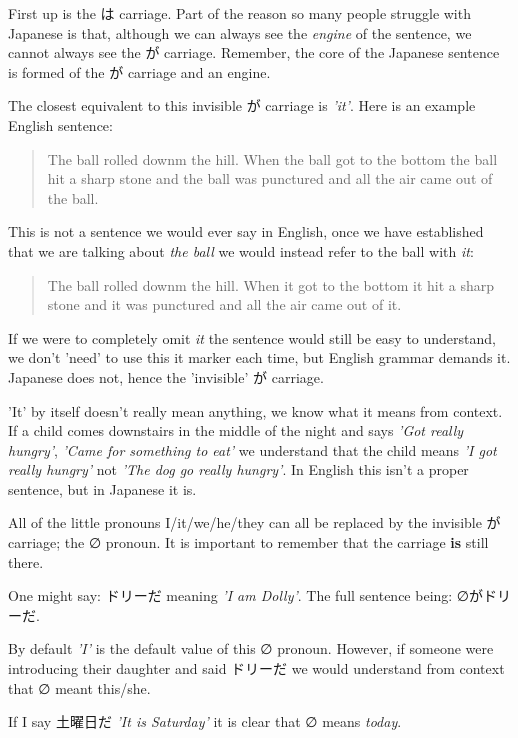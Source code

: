 \documentclass[11pt]{article}
\begin{document}
First up is the は carriage. Part of the reason so many people struggle with Japanese is that, although we can always see the \emph{engine} of the sentence, we cannot always see the が carriage. Remember, the core of the Japanese sentence is formed of the が carriage and an engine.

The closest equivalent to this invisible が carriage is \emph{'it'}. Here is an example English sentence:

\begin{quote}
The ball rolled downm the hill. When the ball got to the bottom the ball hit a sharp stone and the ball was punctured and all the air came out of the ball.
\end{quote}

This is not a sentence we would ever say in English, once we have established that we are talking about \emph{the ball} we would instead refer to the ball with \emph{it}:

\begin{quote}
The ball rolled downm the hill. When it got to the bottom it hit a sharp stone and it was punctured and all the air came out of it.
\end{quote}

If we were to completely omit \emph{it} the sentence would still be easy to understand, we don't 'need' to use this it marker each time, but English grammar demands it. Japanese does not, hence the 'invisible' が carriage.

'It' by itself doesn't really mean anything, we know what it means from context. If a child comes downstairs in the middle of the night and says \emph{'Got really hungry'}, \emph{'Came for something to eat'} we understand that the child means \emph{'I got really hungry'} not \emph{'The dog go really hungry'}. In English this isn't a proper sentence, but in Japanese it is.

All of the little pronouns I/it/we/he/they can all be replaced by the invisible が carriage; the ∅ pronoun. It is important to remember that the carriage \textbf{is} still there.

One might say: ドリーだ meaning \emph{'I am Dolly'}. The full sentence being: ∅がドリーだ.

By default \emph{'I'} is the default value of this ∅ pronoun. However, if someone were introducing their daughter and said ドリーだ we would understand from context that ∅ meant this/she.

If I say 土曜日だ \emph{'It is Saturday'} it is clear that ∅ means \emph{today}.
\end{document}
